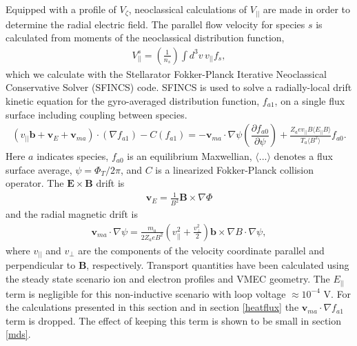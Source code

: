 \documentclass{article}
\numberwithin{figure}{section}
\numberwithin{equation}{section}
\newcommand{\partder}[2]{\dfrac{\partial  #1}{\partial  #2}} %
\begin{document}
Equipped with a profile of $V_{\zeta}$, neoclassical calculations of $V_{||}$ are made in order to determine the radial electric field. The parallel flow velocity for species $s$ is calculated from moments of the neoclassical distribution function,
\begin{gather}
V^s_{||} = \left(\frac{1}{n_s}\right
) \int d^3 v \, v_{||} f_s,
\end{gather}
which we calculate with the Stellarator Fokker-Planck Iterative Neoclassical Conservative Solver (SFINCS) \cite{Landreman2014} code.
SFINCS is used to solve a radially-local drift kinetic equation for the gyro-averaged distribution function, $f_{a1}$, on a single flux surface including coupling between species. 
\begin{gather}
( v_{||} \bm{b} + \bm{v}_E + \bm{v}_{ma}) \cdot (\nabla f_{a1})  - C(f_{a1}) = - \bm{v}_{ma} \cdot \nabla \psi \left( \partder{f_{a0}}{\psi} \right) + \frac{Z_a e v_{||} B \langle E_{||} B \rangle}{T_a \langle B^2 \rangle } f_{a0}.
\label{kineticequation}
\end{gather} 
\hspace{-1mm}
Here $a$ indicates species, $f_{a0}$ is an equilibrium Maxwellian, $ \langle ... \rangle$ denotes a flux surface average, $\psi = \Phi_T/2\pi$, and $C$ is a linearized Fokker-Planck collision operator. The $\bm{E} \times \bm{B}$ drift is 
\begin{gather}
\bm{v}_E = \frac{1}{B^2} \bm{B} \times \nabla \Phi
\end{gather} 
and the radial magnetic drift is
\begin{gather}
\bm{v}_{ma} \cdot \nabla \psi = \frac{m_a }{2Z_a e B^2} \left(v_{||}^2 + \frac{v_{\perp}^2}{2} \right) \bm{b} \times \nabla B \cdot \nabla \psi,
\label{magneticdrift}
\end{gather} 
where $v_{||}$ and $v_{\perp}$ are the components of the velocity coordinate parallel and perpendicular to $\bm{B}$, respectively. Transport quantities have been calculated using the steady state scenario ion and electron profiles and VMEC geometry. The $E_{||}$ term is negligible for this non-inductive scenario with loop voltage $ \approx 10^{-4}$ V. For the calculations presented in this section and in section \ref{heatflux} the $\bm{v}_{ma} \cdot \nabla f_{a1}$ term is dropped. The effect of keeping this term is shown to be small in section \ref{mds}.
\end{document}
